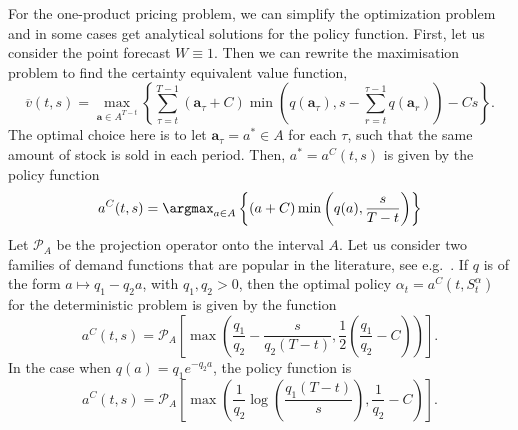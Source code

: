 \documentclass[main.tex]{subfiles}
\begin{document}
For the one-product pricing problem, we can simplify the optimization
problem and in some cases get analytical solutions for the policy function.
First, let us consider the point forecast
$W\equiv 1$.
Then we can rewrite the maximisation problem to find
the certainty equivalent value function,
\begin{equation}
  \overline{v}(t,s)=
  \max_{\mathbf a\in A^{T-t}}\left\{\sum_{\tau=t}^{T-1}(\mathbf
    a_\tau+C)\min\left(q(\mathbf a_\tau),s-\sum_{r=t}^{\tau-1}q(\mathbf a_r)\right)-Cs\right\}.
\end{equation}
The optimal choice here is to let $\mathbf a_\tau=a^*\in A$ for each
$\tau$, such that the same amount of stock is sold in each period.
Then, $a^*=a^C(t,s)$ is given by the policy function
\begin{equation}
  a^C(t,s)=\argmax_{a\in A} \left\{(a+C)\min\left(
      q(a),\frac{s}{T-t}
    \right)\right\}
\end{equation}
Let $\mathcal P_A$ be the projection operator onto the interval $A$.
Let us consider two families of demand functions that are
popular in the literature, see e.g.~\citep[Ch.~7]{talluri2006theory}.
If $q$ is of the form $a\mapsto q_1-q_2a$, with $q_1,q_2> 0$, then
the optimal policy $\alpha_t=a^C(t,S_t^\alpha)$ for the deterministic
problem is given by the function
\begin{equation}
  a^C(t,s)=\mathcal P_A \left[ \max\left(
      \frac{q_1}{q_2}-\frac{s}{q_2(T-t)},\frac{1}{2}\left(\frac{q_1}{q_2}-C
      \right) \right) \right].
\end{equation}
In the case when $q(a)=q_1e^{-q_2a}$, the policy function is
\begin{equation}
  a^C(t,s)=\mathcal P_A\left[
    \max\left( \frac{1}{q_2}\log\left( \frac{q_1(T-t)}{s}\right),
      \frac{1}{q_2}-C  \right)\right].
\end{equation}
\end{document}
